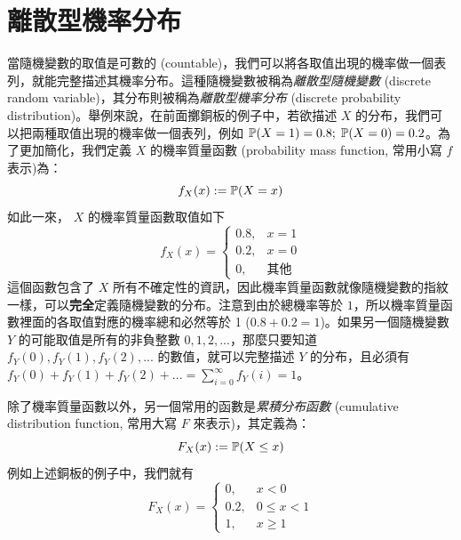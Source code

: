 \section{離散型機率分布}

    當隨機變數的取值是可數的 (countable)，我們可以將各取值出現的機率做一個表列，就能完整描述其機率分布。這種隨機變數被稱為\textit{離散型隨機變數} (discrete random variable)，其分布則被稱為\textit{離散型機率分布} (discrete probability distribution)。舉例來說，在前面擲銅板的例子中，若欲描述 $X$ 的分布，我們可以把兩種取值出現的機率做一個表列，例如 $\mathbb{P}(X = 1) = 0.8;\; \mathbb{P}(X = 0) = 0.2$。為了更加簡化，我們定義 $X$ 的機率質量函數 (probability mass function, 常用小寫 $f$ 表示)為：
    \smallskip
    \[f_X(x) := \mathbb{P}(X = x)\]
    \smallskip
    如此一來， $X$ 的機率質量函數取值如下
    \smallskip
    \[f_X(x) = \left\{\begin{array}{rl}
            0.8, & x = 1\\
            0.2, & x = 0\\
            0, & \text{其他}
        \end{array}\right.\]
    \smallskip
    這個函數包含了 $X$ 所有不確定性的資訊，因此機率質量函數就像隨機變數的指紋一樣，可以\textbf{完全}定義隨機變數的分布。注意到由於總機率等於 $1$，所以機率質量函數裡面的各取值對應的機率總和必然等於 1 ($0.8+0.2=1$)。如果另一個隨機變數 $Y$ 的可能取值是所有的非負整數 $0, 1, 2, ...$，那麼只要知道 $f_Y(0), f_Y(1), f_Y(2), ...$ 的數值，就可以完整描述 $Y$ 的分布，且必須有$f_Y(0)+f_Y(1)+f_Y(2)+... = \sum_{i=0}^\infty f_Y(i) = 1$。
    
    除了機率質量函數以外，另一個常用的函數是\textit{累積分布函數} (cumulative distribution function, 常用大寫 $F$ 來表示)，其定義為：
    \smallskip
    \[F_X(x) := \mathbb{P}(X \le x)\]
    \smallskip
    例如上述銅板的例子中，我們就有
    \smallskip
    \[F_X(x) = \left\{\begin{array}{rl}
        0, & x < 0\\
        0.2, & 0 \le x < 1\\
        1, & x \ge 1
    \end{array}\right.\]
    
